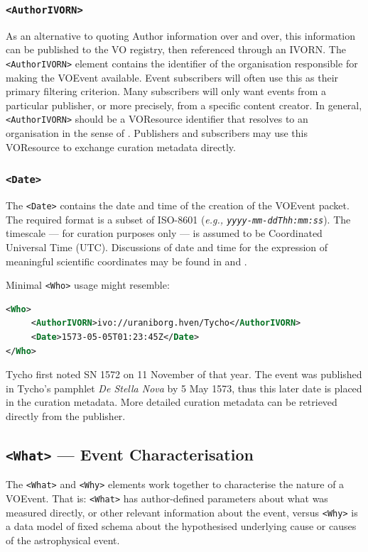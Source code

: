 \documentclass[11pt,a4paper]{ivoa}
\begin{document}
\subsubsection{\tt <AuthorIVORN>}
As an alternative to quoting Author information over and over, this information can be published to the VO registry, then referenced through an IVORN. The {\tt <AuthorIVORN>} element contains the identifier of the organisation responsible for making the VOEvent available. Event subscribers will often use this as their primary filtering criterion. Many subscribers will only want events from a particular publisher, or more precisely, from a specific content creator. In general, {\tt <AuthorIVORN>} should be a VOResource identifier that resolves to an organisation in the sense of \citep{2007ivoa.spec.0302H}. Publishers and subscribers may use this VOResource to exchange curation metadata directly. 

\subsubsection{\tt <Date>}
The {\tt <Date>} contains the date and time of the creation of the VOEvent packet. The required format is a subset of ISO-8601 (\emph{e.g., {\tt yyyy-mm-ddThh:mm:ss}}). The timescale --- for curation purposes only --- is assumed to be Coordinated Universal Time (UTC). Discussions of date and time for the expression of meaningful scientific coordinates may be found in \citep{2007ivoa.spec.1030R} and \citep{bib26}. 


Minimal {\tt <Who>} usage might resemble: 
\begin{lstlisting}[language=XML]
<Who>
     <AuthorIVORN>ivo://uraniborg.hven/Tycho</AuthorIVORN>
     <Date>1573-05-05T01:23:45Z</Date>
</Who> 
\end{lstlisting}
Tycho first noted SN 1572 on 11 November of that year. The event was published in Tycho's pamphlet \emph{De Stella Nova} by 5 May 1573, thus this later date is placed in the curation metadata. More detailed curation metadata can be retrieved directly from the publisher. 


\subsection{{\tt <What>} --- Event Characterisation}
\label{sec:3.3}
The {\tt <What>} and {\tt <Why>} elements work together to characterise the nature of a VOEvent. That is: {\tt <What>} has author-defined parameters about what was measured directly, or other relevant information about the event, versus {\tt <Why>} is a data model of fixed schema about the hypothesised underlying cause or causes of the astrophysical event. 
\end{document}
